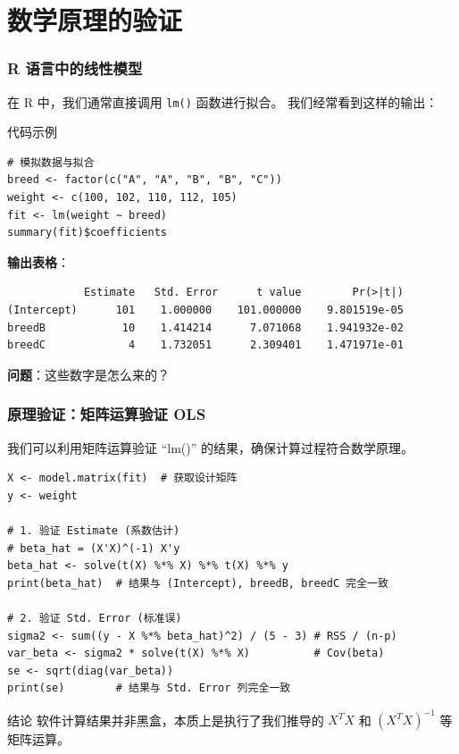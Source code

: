 
\section[验证]{数学原理的验证}


\begin{frame}[fragile]
\frametitle{R 语言中的线性模型}

在 R 中，我们通常直接调用 \verb|lm()| 函数进行拟合。
我们经常看到这样的输出：

\begin{block}{代码示例}
\begin{verbatim}
# 模拟数据与拟合
breed <- factor(c("A", "A", "B", "B", "C"))
weight <- c(100, 102, 110, 112, 105)
fit <- lm(weight ~ breed)
summary(fit)$coefficients
\end{verbatim}
\end{block}

\pause
\textbf{输出表格}：
\begin{verbatim}
            Estimate   Std. Error      t value        Pr(>|t|)
(Intercept)      101    1.000000    101.000000    9.801519e-05
breedB            10    1.414214      7.071068    1.941932e-02
breedC             4    1.732051      2.309401    1.471971e-01
\end{verbatim}

\textbf{问题}：这些数字是怎么来的？

\end{frame}


\begin{frame}[fragile]
\frametitle{原理验证：矩阵运算验证 OLS}

我们可以利用矩阵运算验证 ``lm()'' 的结果，确保计算过程符合数学原理。

\begin{verbatim}
X <- model.matrix(fit)  # 获取设计矩阵
y <- weight

# 1. 验证 Estimate (系数估计)
# beta_hat = (X'X)^(-1) X'y
beta_hat <- solve(t(X) %*% X) %*% t(X) %*% y
print(beta_hat)  # 结果与 (Intercept), breedB, breedC 完全一致

# 2. 验证 Std. Error (标准误)
sigma2 <- sum((y - X %*% beta_hat)^2) / (5 - 3) # RSS / (n-p)
var_beta <- sigma2 * solve(t(X) %*% X)          # Cov(beta)
se <- sqrt(diag(var_beta))
print(se)        # 结果与 Std. Error 列完全一致
\end{verbatim}

\begin{alertblock}{结论}
软件计算结果并非黑盒，本质上是执行了我们推导的 $X^T X$ 和 $(X^T X)^{-1}$ 等矩阵运算。
\end{alertblock}

\end{frame}

